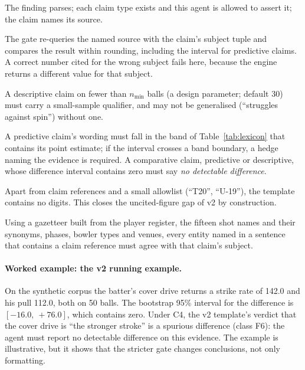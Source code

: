 \documentclass[11pt,a4paper]{article}
\begin{document}
\begin{description}[leftmargin=1.2em,style=nextline,itemsep=2pt]
\item[C1 --- Schema and registry.] The finding parses; each claim type exists
  and this agent is allowed to assert it; the claim names its source.
\item[C2 --- Subject-bound value.] The gate re-queries the named source with the
  claim's subject tuple and compares the result within rounding, including the
  interval for predictive claims. A correct number cited for the wrong subject
  fails here, because the engine returns a different value for that subject.
\item[C3 --- Evidence floor.] A descriptive claim on fewer than $n_{\min}$ balls
  (a design parameter; default 30) must carry a small-sample qualifier, and may
  not be generalised (``struggles against spin'') without one.
\item[C4 --- Interval and wording.] A predictive claim's wording must fall in
  the band of Table~\ref{tab:lexicon} that contains its point estimate; if the
  interval crosses a band boundary, a hedge naming the evidence is required. A
  comparative claim, predictive or descriptive, whose difference interval
  contains zero must say \emph{no detectable difference}.
\item[C5 --- No orphan numbers.] Apart from claim references and a small
  allowlist (``T20'', ``U-19''), the template contains no digits. This closes
  the uncited-figure gap of v2 by construction.
\item[C6 --- Prose subjects agree.] Using a gazetteer built from the player
  register, the fifteen shot names and their synonyms, phases, bowler types and
  venues, every entity named in a sentence that contains a claim reference must
  agree with that claim's subject.
\end{description}

\paragraph{Worked example: the v2 running example.} On the synthetic corpus the
batter's cover drive returns a strike rate of 142.0 and his pull 112.0, both on
50 balls. The bootstrap 95\% interval for the difference is $[-16.0,\ +76.0]$,
which contains zero. Under C4, the v2 template's verdict that the cover drive
is ``the stronger stroke'' is a spurious difference (class F6): the agent must
report no detectable difference on this evidence. The example is illustrative,
but it shows that the stricter gate changes conclusions, not only formatting.
\end{document}
